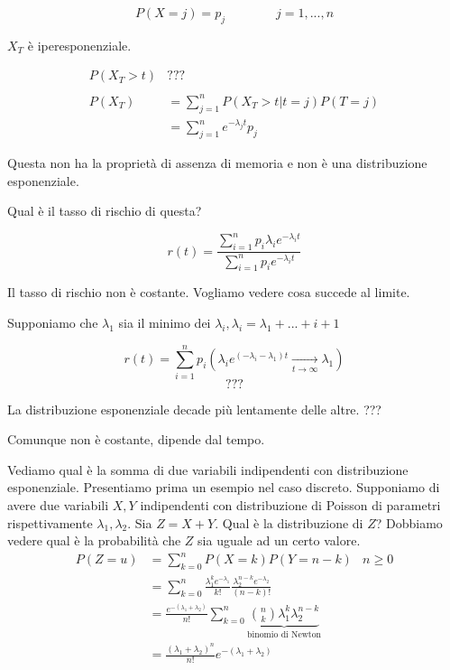 \documentclass[a4paper,12pt]{book}
\begin{document}
$$ P(X = j) = p_j \qquad \qquad j = 1, ..., n $$

$ X_T $ è iperesponenziale.

\begin{align*}
	P(X_T > t) & ??? \\ %
	\\
	P(X_T) & = \sum_{j=1}^{n} P(X_T > t | t = j) P (T = j) \\
	& = \sum_{j = 1}^{n} e ^{-\lambda_j t} p_j
\end{align*}

Questa non ha la proprietà di assenza di memoria e non è una distribuzione esponenziale. 



Qual è il tasso di rischio di questa? %

$$ r(t) = \frac{\sum_{i = 1}^{n} p_i \lambda_i e^{-\lambda_i t}}{\sum_{i = 1}^{n} p_i e^{-\lambda_i t}} $$

Il tasso di rischio non è costante. Vogliamo vedere cosa succede al limite. 

Supponiamo che $\lambda_1$ sia il minimo dei $\lambda_i, \lambda_i = \lambda_1 + ... + i + 1$ %

$$ r(t) = \sum_{i = 1}^{n} p_i(\lambda_i e ^{(-\lambda_i - \lambda_1) t } \underset{t \to \infty}{\longrightarrow} \lambda_1) $$
$$ ??? $$ %

La distribuzione esponenziale decade più lentamente delle altre. ??? %

Comunque non è costante, dipende dal tempo. 

Vediamo qual è la somma di due variabili indipendenti con distribuzione esponenziale. Presentiamo prima un esempio nel caso discreto. Supponiamo di avere due variabili $ X, Y $ indipendenti con distribuzione di Poisson di parametri rispettivamente $\lambda_1, \lambda_2$. Sia $ Z = X + Y $. Qual è la distribuzione di $ Z $? Dobbiamo vedere qual è la probabilità che $ Z $ sia uguale ad un certo valore. 
\begin{align*}
	P(Z = u) & = \sum_{k = 0}^{n} P(X = k)P(Y = n-k) & n \ge 0 \\
	& = \sum_{k=0}^{n} \frac{\lambda_1^k e^{-\lambda_1}} {k!} \frac{\lambda_2^{n-k} e^{-\lambda_2}}{(n-k)!} \\
	& = \frac{e^{-(\lambda_1 + \lambda_2)}}{n!} \sum_{k=0}^{n} \underbrace{\binom{n}{k} \lambda_1^k \lambda_2^{n-k}}_{\text{binomio di Newton}} \\
	& = \frac{(\lambda_1 + \lambda_2)^n}{n!} e^{-(\lambda_1 + \lambda_2)}
\end{align*}
\end{document}
